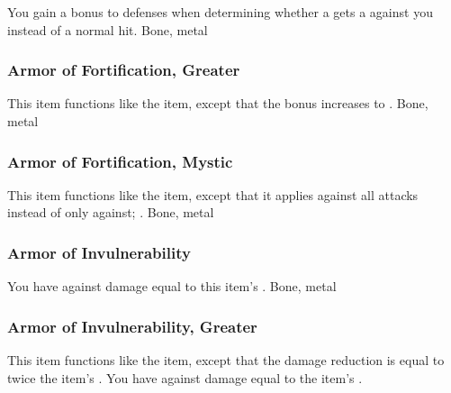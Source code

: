 You gain a  bonus to defenses when determining whether a  gets a  against you instead of a normal hit.
 
 Bone, metal
\lowercase{\hypertarget{item:Armor of Fortification, Greater}{}}\label{item:Armor of Fortification, Greater}
\hypertarget{item:Armor of Fortification, Greater}{\subsubsection{Armor of Fortification, Greater\hfill{}}}
This item functions like the  item, except that the bonus increases to .
 
 Bone, metal
\lowercase{\hypertarget{item:Armor of Fortification, Mystic}{}}\label{item:Armor of Fortification, Mystic}
\hypertarget{item:Armor of Fortification, Mystic}{\subsubsection{Armor of Fortification, Mystic\hfill{}}}
This item functions like the  item, except that it applies against all attacks instead of only against; .
 
 Bone, metal
\lowercase{\hypertarget{item:Armor of Invulnerability}{}}\label{item:Armor of Invulnerability}
\hypertarget{item:Armor of Invulnerability}{\subsubsection{Armor of Invulnerability\hfill{}}}
You have  against  damage equal to this item's .
 
 Bone, metal
\lowercase{\hypertarget{item:Armor of Invulnerability, Greater}{}}\label{item:Armor of Invulnerability, Greater}
\hypertarget{item:Armor of Invulnerability, Greater}{\subsubsection{Armor of Invulnerability, Greater\hfill{}}}
This item functions like the  item, except that the damage reduction is equal to twice the item's .
You have  against  damage equal to the item's .
 
